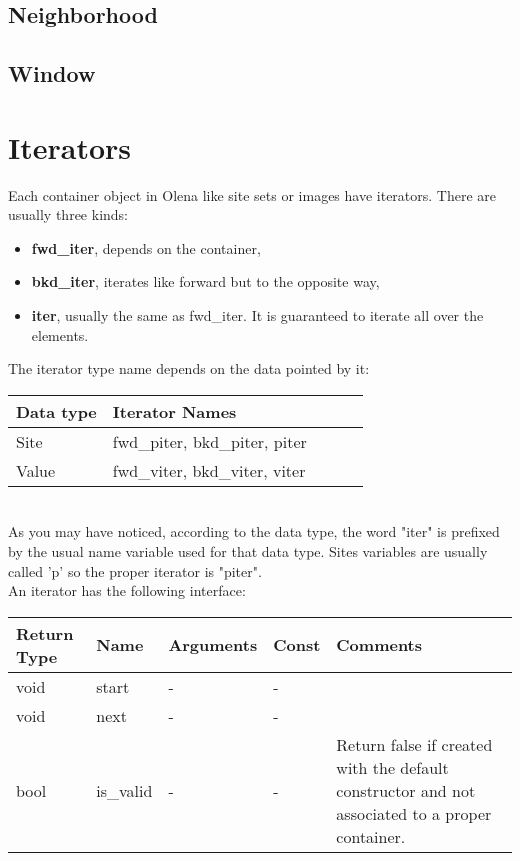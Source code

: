 \documentclass{report}
\begin{document}
\newpage
\section{Neighborhood}



\newpage
\section{Window}



\chapter{Iterators}

Each container object in Olena like site sets or images have iterators.
There are usually three kinds:
\begin{itemize}
\item \textbf{fwd\_iter}, depends on the container,
\item \textbf{bkd\_iter}, iterates like forward but to the opposite way,
\item \textbf{iter}, usually the same as fwd\_iter. It is guaranteed to
iterate all over the elements.
\end{itemize}

The iterator type name depends on the data pointed by it: \\

\begin{tabular}{|l|l|l|l|p{4cm}|}
\hline
Data type & Iterator Names \\ \hline
Site & fwd\_piter, bkd\_piter, piter \\ \hline
Value & fwd\_viter, bkd\_viter, viter \\ \hline
\end{tabular} \\

As you may have noticed, according to the data type, the word "iter" is prefixed
by the usual name variable used for that data type. Sites variables are usually
called 'p' so the proper iterator is "piter".\\


An iterator has the following interface: \\

\begin{tabular}{|l|l|l|l|p{4cm}|}
\hline
Return Type & Name & Arguments & Const & Comments \\ \hline

void & start & - & - & \\ \hline
void & next & - & - & \\ \hline
bool & is\_valid & - & - & Return false if created with the default
constructor and not associated to a proper container.\\ \hline
\end{tabular} \\
\end{document}
